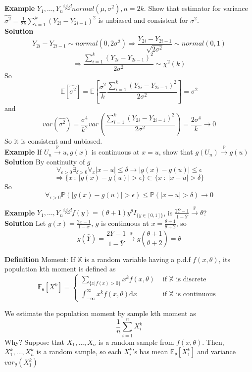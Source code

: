 \documentclass[a4paper,12pt]{article}
\begin{document}
\textbf{Example} $Y_1, ..., Y_n \overset{i.i.d}{\sim} normal(\mu, \sigma^2), n=2k$. Show that estimator for variance $\hat{\sigma^2} = \frac{1}{2k}\sum_{i=1}^k(Y_{2i} - Y_{2i-1})^2$ is unbiased and consistent for $\sigma^2$.\\

\textbf{Solution}
$$Y_{2i} - Y_{2i-1} \sim normal(0, 2\sigma^2) \Rightarrow \frac{Y_{2i} - Y_{2i-1}}{\sqrt{2\sigma^2}} \sim normal(0, 1)$$
$$\Rightarrow\frac{\sum_{i=1}^k(Y_{2i} - Y_{2i-1})^2}{2\sigma^2} \sim \chi^2(k)$$
So
$$\mathbb{E}[ \hat{\sigma^2} ] = \mathbb{E}[\frac{\sigma^2}{k} \frac{\sum_{i=1}^k(Y_{2i} - Y_{2i-1})^2}{2\sigma^2}] = \sigma^2$$
and
$$var(\hat{\sigma^2}) = \frac{\sigma^4}{k^2} var(  \frac{\sum_{i=1}^k(Y_{2i} - Y_{2i-1})^2}{2\sigma^2} ) = \frac{2\sigma^4}{k} \to 0$$
So it is consistent and unbiased.\\

\textbf{Example} If $U_n \overset{\mathbb{P}}{\to} u, g(x)$ is continuous at $x=u$, show that $g(U_n) \overset{\mathbb{P}}{\to} g(u)$\\

\textbf{Solution} By continuity of $g$
$$\forall_{\epsilon > 0} \exists_{\delta>0} \forall_{x} |x-u|\leq\delta \to |g(x)-g(u)|\leq \epsilon$$
$$\Rightarrow \{ x\ : \ |g(x)-g(u)| > \epsilon \} \subset \{ x\ : \ |x-u|> \delta \}$$
So
$$\forall_{\epsilon > 0} \mathbb{P}( |g(x)-g(u)| > \epsilon ) \leq \mathbb{P}( |x-u|> \delta ) \to 0$$

\textbf{Example} $Y_1, ..., Y_n \overset{i.i.d}{\sim} f(y) = (\theta+1)y^\theta I_{\{y\in[0,1]\}}$, is $\frac{2\bar{Y}-1}{1-\bar{Y}} \overset{\mathbb{P}}{\to} \theta$?\\

\textbf{Solution} Let $g(x) = \frac{2x-1}{1-x}$, $g$ is continuous at $x = \frac{\theta+1}{\theta+2}$, so $$g(\bar{Y}) = \frac{2\bar{Y}-1}{1-\bar{Y}} \overset{\mathbb{P}}{\to} g(\frac{\theta+1}{\theta+2}) = \theta$$

\textbf{Definition} Moment: If $\mathbb{X}$ is a random variable having a p.d.f $f(x, \theta)$, its population kth moment is defined as\\
$$\mathbb{E}_\theta[X^k] = 
\begin{cases}
\sum_{\{x|f(x) > 0\}} x^k f(x, \theta) & \text{ if } \mathbb{X} \text{ is discrete }\\
\int_{-\infty}^\infty x^k f(x, \theta) \mathrm{d}x & \text{ if } \mathbb{X} \text{ is continuous }
\end{cases}$$

We estimate the population moment by sample kth moment as $$\frac{1}{n}\sum_{i=1}^n X_i^k$$
Why? Suppose that $X_1, ..., X_n$ is a random sample from $f(x, \theta)$. Then, $X_1^k, ..., X_n^k$ is a random sample, so each $X_i^k$'s has mean $\mathbb{E}_\theta[X_1^k]$ and variance $var_\theta( X_1^k )$
\end{document}
